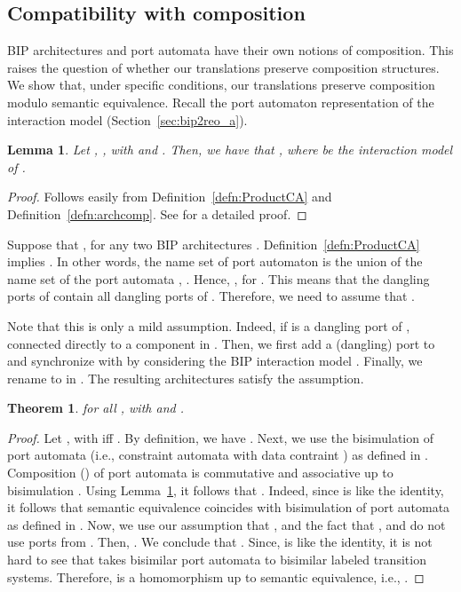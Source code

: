 \documentclass[submission,copyright,creativecommons,hidelinks]{eptcs}
\theoremstyle{plain} \newtheorem{theorem}{Theorem}
\newtheorem{lemma}{Lemma}
\theoremstyle{definition}
\theoremstyle{remark}
\newcommand{\defn}[1]{Definition~\ref{defn:#1}}
\newcommand{\secn}[1]{Section~\ref{sec:#1}}
\newcommand{\lem}[1]{Lemma~\ref{lem:#1}}
\begin{document}
\subsection{Compatibility with composition} 
\label{sec:compatcomposition}

BIP architectures and port automata have their own notions of composition.
This raises the question of whether our translations preserve composition structures. 
We show that, under specific conditions, our translations preserve composition modulo semantic equivalence. Recall the port automaton representation of the interaction model (\secn{bip2reo_a}).

\begin{lemma}
\label{lem:interaction}
Let , , with  and .  
Then, we have that ,
where  be the interaction model of .
\end{lemma}

\begin{proof}
Follows easily from \defn{ProductCA} and \defn{archcomp}. See \cite{bip2reo} for a detailed proof.
\end{proof}

Suppose that , for any two BIP architectures . \defn{ProductCA} implies . In other words, the name set of port automaton  is the union of the name set of the port automata , . Hence, , for . This means that the dangling ports of  contain all dangling ports of . Therefore, we need to assume that .

Note that this is only a mild assumption. Indeed, if  is a dangling port of , connected directly to a component in . Then, we first add a (dangling) port  to  and synchronize  with  by considering the BIP interaction model . Finally, we rename  to  in . The resulting architectures satisfy the assumption.

\begin{theorem}
\label{thm:homreo} 
 for all , with  and .
\end{theorem}

\begin{proof}
Let , with  iff . By definition, we have . Next, we use the bisimulation of port automata (i.e., constraint automata with data contraint ) as defined in \cite{BSAR06}. Composition () of port automata is commutative and associative up to bisimulation \cite{BSAR06}. Using \lem{interaction}, it follows that .
Indeed, since  is like the identity, it follows that semantic equivalence  coincides with bisimulation  of port automata as defined in \cite{BSAR06}.
Now, we use our assumption that , and the fact that , and  do not use ports from . Then, .
We conclude that .
Since,  is like the identity, it is not hard to see that  takes bisimilar port automata to bisimilar labeled transition systems. Therefore,  is a homomorphism up to semantic equivalence, i.e., .
\end{proof}
\end{document}
